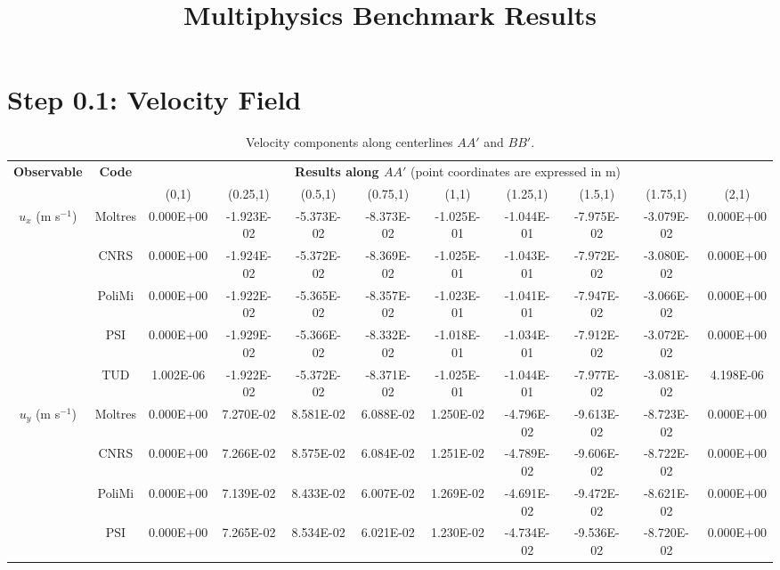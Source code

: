 \documentclass[letterpaper,11pt]{article}
\begin{document}
%
\title{Multiphysics Benchmark Results}
\author{}
\date{}
%
\maketitle
%
\section*{Step 0.1: Velocity Field}

\begin{table}[htbp!]
	\caption{Velocity components along centerlines $AA'$ and $BB'$.}
	\centering
	\footnotesize
	\setlength\tabcolsep{1.5pt}
	\begin{tabular}{c c c c c c c c c c c}
		\toprule
		\multirow{2}{*}{\textbf{Observable}} & \multirow{2}{*}{\textbf{Code}} & \multicolumn{9}{c}{\textbf{Results along $AA'$} (point coordinates are expressed in m)} \\
		& & {(0,1)} & {(0.25,1)} & {(0.5,1)} & {(0.75,1)} & {(1,1)} & {(1.25,1)} & {(1.5,1)} & {(1.75,1)} & {(2,1)} \\
		\midrule
		\multirow{5}{*}{$u_x$ (m s$^{-1}$)} & Moltres & 0.000E+00 & -1.923E-02 & -5.373E-02 & -8.373E-02 & -1.025E-01 & -1.044E-01 & -7.975E-02 & -3.079E-02 & 0.000E+00 \\
		& CNRS & 0.000E+00 & -1.924E-02 & -5.372E-02 & -8.369E-02 & -1.025E-01 & -1.043E-01 & -7.972E-02 & -3.080E-02 & 0.000E+00 \\
        & PoliMi & 0.000E+00 & -1.922E-02 & -5.365E-02 & -8.357E-02 & -1.023E-01 & -1.041E-01 & -7.947E-02 & -3.066E-02 & 0.000E+00 \\
        & PSI & 0.000E+00 & -1.929E-02 & -5.366E-02 & -8.332E-02 & -1.018E-01 & -1.034E-01 & -7.912E-02 & -3.072E-02 & 0.000E+00 \\
        & TUD & 1.002E-06 & -1.922E-02 & -5.372E-02 & -8.371E-02 & -1.025E-01 & -1.044E-01 & -7.977E-02 & -3.081E-02 & 4.198E-06 \\
        \midrule
		\multirow{5}{*}{$u_y$ (m s$^{-1}$)} & Moltres & 0.000E+00 & 7.270E-02 & 8.581E-02 & 6.088E-02 & 1.250E-02 & -4.796E-02 & -9.613E-02 & -8.723E-02 & 0.000E+00\\
		& CNRS & 0.000E+00 & 7.266E-02 & 8.575E-02 & 6.084E-02 & 1.251E-02 & -4.789E-02 & -9.606E-02 & -8.722E-02 & 0.000E+00 \\
        & PoliMi & 0.000E+00 & 7.139E-02 & 8.433E-02 & 6.007E-02 & 1.269E-02 & -4.691E-02 & -9.472E-02 & -8.621E-02 & 0.000E+00 \\
        & PSI & 0.000E+00 & 7.265E-02 & 8.534E-02 & 6.021E-02 & 1.230E-02 & -4.734E-02 & -9.536E-02 & -8.720E-02 & 0.000E+00 \\

\end{tabular}
\end{table}
\end{document}
